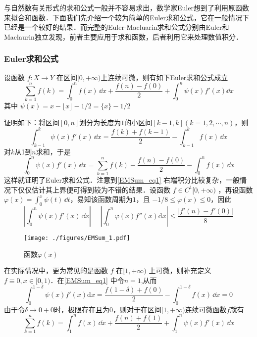 
与自然数有关形式的求和公式一般并不容易求出，数学家Euler想到了利用原函数来拟合和函数．下面我们先介绍一个较为简单的Euler求和公式，它在一般情况下已经是一个较好的结果．而完整的Euler-Macluarin求和公式分别由Euler和Maclaurin独立发现，前者主要应用于求和函数，后者利用它来处理数值积分．

\subsubsection{Euler求和公式}

\begin{theorem}{}
设函数 $f:X\to Y$ 在区间$[0,+\infty)$上连续可微，则有如下Euler求和公式成立	
        \begin{equation}\label{EMSum_eq1} 
            \sum_{k=1}^{n}f(k)=\int_{0}^{n}f(x)\,\dd x
            +\frac{f(n)-f(0)}{2}+\int_{0}^{n}\psi(x)f'(x)\dd x
        \end{equation}
    其中 $\psi(x)=x-\lfloor x \rfloor-1/2=\{x\}-1/2$
\end{theorem}
证明如下：将区间$[0,n]$划分为长度为$1$的小区间$[k-1,k](k=1,2,\cdots,n)$，则
​\[
    \int_{k-1}^{k}\psi(x)f'(x)\,\dd x
    =\frac{f(k)+f(k-1)}{2}-\int_{k-1}^{k}f(x)\,\dd x
\]
​对$k$从1到$n$求和，于是
​\[
    \int_{0}^{n}\psi(x)f'(x)\,\dd x
    =\sum_{k=1}^{n}f(k)-\frac{f(n)-f(0)}{2}-\int_{0}^{n}f(x)\,\dd x
\]
这样就证明了Euler求和公式．注意到\autoref{EMSum_eq1}  右端积分比较复杂，一般情况下仅仅估计其上界便可得到较为不错的结果．设函数 $f\in{C^1[0,+\infty)}$ ，再设函数$\varphi(x)=\displaystyle{\int_{0}^{x}\psi(t)\,\dd t}$，易知该函数周期为$1$，且
 $-1/8\leqslant\varphi(x)\leqslant 0$，因此
\[
    \left|\int_{0}^{n}\psi(x)f'(x)\,\dd x\right|
    =\left|\int_{0}^{n}\varphi(x)f''(x)\mathrm{d}x\right|
    \leqslant\frac{|f'(n)-f'(0)|}{8}
\]
\begin{figure}[ht]
\centering
\texttt{[image: ./figures/EMSum\_1.pdf]}
\caption{函数$\varphi(x)$} \label{EMSum_fig1}
\end{figure}
在实际情况中，更为常见的是函数 $f$ 在$[1,+\infty)$ 上可微，则补充定义$ f\equiv 0,x\in[0,1)$．在\autoref{EMSum_eq1}  中令$n=1$,从而
\[
    \int_{0}^{1-\delta}\psi(x)f'(x)\mathrm{d}x
    =\frac{f(1-\delta)+f(0)}{2}-\int_{0}^{1-\delta}f(x)\,\dd x=0
\]
由于令$\delta\to0+0$时，极限存在且为$0$，则对于在区间$[1,+\infty)$连续可微函数$f$就有
\begin{equation}\label{EMSum_eq2}
    \sum_{k=1}^{n}f(k)
    =\int_{1}^{n}f(x)\,\dd x+\frac{f(n)+f(1)}{2}+\int_{1}^{n}\psi(x)f'(x)\,\dd x
\end{equation}
